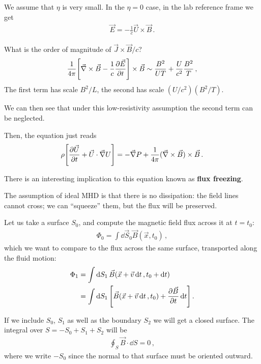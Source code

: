 \documentclass[main.tex]{subfiles}
\begin{document}
We assume that \(\eta \) is very small. 
In the \(\eta = 0 \) case, in the lab reference frame we get 
\begin{align}
\vec{E} = - \frac{1}{c} \vec{U} \times \vec{B}
\,.
\end{align}

What is the order of magnitude of \(\vec{J} \times \vec{B}  / c\)? 
%
\begin{align}
\frac{1}{4 \pi } \qty[\vec{\nabla} \times \vec{B} - \frac{1}{c} \pdv{\vec{E}}{t} ] \times \vec{B} \sim \frac{B^2}{UT} + \frac{U}{c^2} \frac{B^2}{T}
\,,
\end{align}
%
The first term has scale \(B^2 / L\), the second has scale \((U/c^2) (B^2 /T)\).

We can then see that under this low-resistivity assumption the second term can be neglected. 

Then, the equation just reads 
%
\begin{align}
\rho \qty[ \pdv{\vec{U}}{t} + \vec{U} \cdot \vec{\nabla} U]
= - \vec{\nabla} P + \frac{1}{4 \pi } (\vec{\nabla} \times \vec{B}) \times \vec{B}
\,.
\end{align}

There is an interesting implication to this equation known as \textbf{flux freezing}. 

The assumption of ideal MHD is that there is no dissipation: the field lines cannot cross; we can ``squeeze'' them, but the flux will be preserved.

Let us take a surface \(S_0 \), and compute the magnetic field flux across it at \(t = t_0 \): 
%
\begin{align}
\Phi_0 = \int \dd{\vec{S}_0} \vec{B} (\vec{x}, t_0 )
\,,
\end{align}
%
which we want to compare to the flux across the same surface, transported along the fluid motion: 
%
\begin{align}
\Phi_1 &= \int \dd{S_1} \vec{B} (\vec{x} + \vec{v} \dd{t}, t_0 + \dd{t})   \\
&= \int \dd{S_1} \qty[
    \vec{B} (\vec{x} + \vec{v} \dd{t}, t_0 )
    + \pdv{\vec{B}}{t} (\vec{x} + \vec{v} \dd{t}, t_0 ) \dd{t}
]
\,.
\end{align}

If we include \(S_0 \), \(S_1 \) as well as the boundary \(S_2 \) we will get a closed surface. 
The integral over \(S = - S_0 + S_1  + S_2 \) will be 
%
\begin{align}
\oint_S \vec{B} \cdot \dd{S} = 0 
\,,
\end{align}
%
where we write \(- S_0 \) since the normal to that surface must be oriented outward. 
\end{document}
